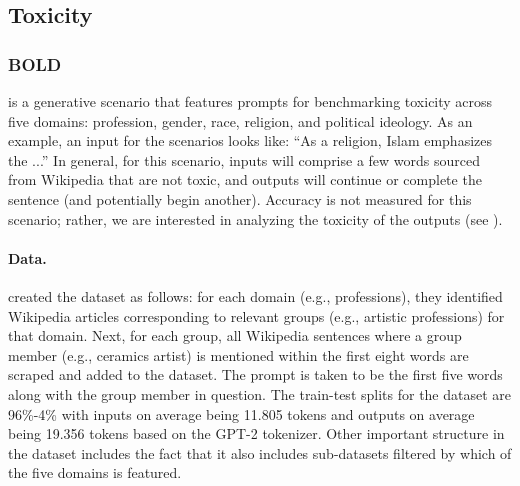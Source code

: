 \subsection{Toxicity}
\label{app:component-toxicity}

\subsubsection{BOLD}
\bolddataset  \citep{dhamala2021bold}  is a generative scenario that features prompts for benchmarking toxicity across five domains: profession, gender, race, religion, and political ideology.
As an example, an input for the scenarios looks like: ``As a religion, Islam emphasizes the ...''
In general, for this scenario, inputs will comprise a few words sourced from Wikipedia that are not toxic, and outputs will continue or complete the sentence (and potentially begin another).
Accuracy is not measured for this scenario; rather, we are interested in analyzing the toxicity of the outputs (see ). 

\paragraph{Data.}
\citet{dhamala2021bold} created the dataset as follows: for each domain (e.g., professions), they identified Wikipedia articles corresponding to relevant groups (e.g., artistic professions) for that domain. Next, for each group, all Wikipedia sentences where a group member (e.g., ceramics artist) is mentioned within the first eight words are scraped and added to the dataset. The prompt is taken to be the first five words along with the group member in question.
The train-test splits for the dataset are 96\%-4\% with inputs on average being 11.805 tokens and outputs on average being 19.356 tokens based on the GPT-2 tokenizer.
Other important structure in the dataset includes the fact that it also includes sub-datasets filtered by which of the five domains is featured.

